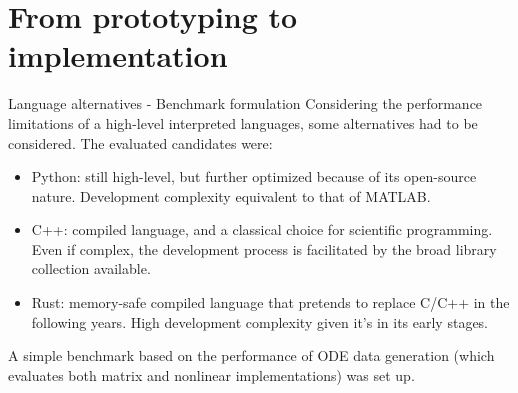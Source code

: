 \documentclass{beamer}
\begin{document}
\section{From prototyping to implementation}

\begin{frame}{Language alternatives - Benchmark formulation}
    Considering the performance limitations of a high-level interpreted languages, some alternatives had to be considered. The evaluated candidates were:

    \begin{itemize}
        \item Python: still high-level, but further optimized because of its open-source nature. Development complexity equivalent to that of MATLAB.
        \item C++: compiled language, and a classical choice for scientific programming. Even if complex, the development process is facilitated by the broad library collection available.
        \item Rust: memory-safe compiled language that pretends to replace C/C++ in the following years. High development complexity given it's in its early stages.
    \end{itemize}

    A simple benchmark based on the performance of ODE data generation (which evaluates both matrix and nonlinear implementations) was set up.
\end{frame}
\end{document}
